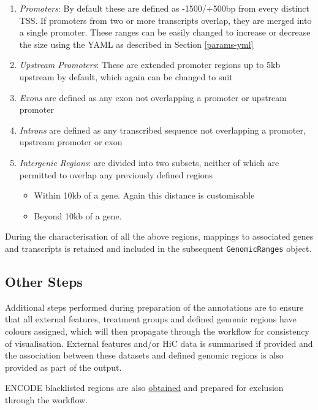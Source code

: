 \documentclass[
]{book}
\providecommand{\tightlist}{%
  \setlength{\itemsep}{0pt}\setlength{\parskip}{0pt}}
\begin{document}
\begin{enumerate}
\def\labelenumi{\arabic{enumi}.}
\tightlist
\item
  \emph{Promoters}: By default these are defined as -1500/+500bp from every distinct TSS.
  If promoters from two or more transcripts overlap, they are merged into a single promoter.
  These ranges can be easily changed to increase or decrease the size using the YAML as described in Section \ref{params-yml}
\item
  \emph{Upstream Promoters}: These are extended promoter regions up to 5kb upstream by default, which again can be changed to suit
\item
  \emph{Exons} are defined as any exon not overlapping a promoter or upstream promoter
\item
  \emph{Introns} are defined as any transcribed sequence not overlapping a promoter, upstream promoter or exon
\item
  \emph{Intergenic Regions}: are divided into two subsets, neither of which are permitted to overlap any previously defined regions

  \begin{itemize}
  \tightlist
  \item
    Within 10kb of a gene. Again this distance is customisable
  \item
    Beyond 10kb of a gene.
  \end{itemize}
\end{enumerate}

During the characterisation of all the above regions, mappings to associated genes and transcripts is retained and included in the subsequent \texttt{GenomicRanges} object.

\hypertarget{other-steps}{%
\subsection*{Other Steps}\label{other-steps}}

Additional steps performed during preparation of the annotations are to ensure that all external features, treatment groups and defined genomic regions have colours assigned, which will then propagate through the workflow for consistency of visualisation.
External features and/or HiC data is summarised if provided and the association between these datasets and defined genomic regions is also provided as part of the output.

ENCODE blacklisted regions are also \href{https://github.com/Boyle-Lab/Blacklist}{obtained} and prepared for exclusion through the workflow.
\end{document}
